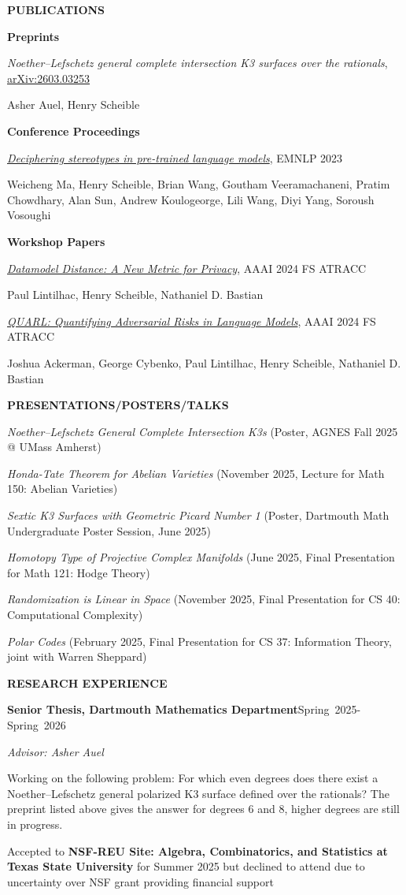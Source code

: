 \documentclass[letterpaper,11pt]{article}
\newcommand{\entrygap}{\par\addvspace{\baselineskip}}
\newcommand{\cvsection}[1]{\entrygap\textbf{\MakeUppercase{#1}}\par\nobreak\entrygap}
\newcommand{\cvsubhead}[1]{\textbf{#1}\par\nobreak}
\newcommand{\datedline}[2]{#1\hfill\mbox{#2}\par\nobreak}
\newcommand{\researchrole}[2]{\datedline{\textbf{#1}}{#2}}
\newcommand{\arxiv}[1]{\href{https://arxiv.org/abs/#1}{arXiv:#1}}
\newcommand{\doititle}[2]{\href{https://doi.org/#1}{#2}}
\newcommand{\publication}[3]{\textit{#1}, #2\par\nobreak #3\par}
\newenvironment{talks}{%
  \begin{list}{\textbullet}{%
    \setlength{\leftmargin}{36bp}\setlength{\labelsep}{10bp}%
    \setlength{\topsep}{0pt}\setlength{\partopsep}{0pt}%
    \setlength{\parsep}{0pt}\setlength{\itemsep}{0pt}}%
}{\end{list}}
\newcommand{\talk}[2]{\item \textit{#1} (#2)}
\begin{document}
\cvsection{Publications}
\cvsubhead{Preprints}
\publication{Noether–Lefschetz general complete intersection K3 surfaces over the rationals}{\arxiv{2603.03253}}{Asher Auel, Henry Scheible}

\entrygap
\cvsubhead{Conference Proceedings}
\publication{\doititle{10.18653/v1/2023.emnlp-main.697}{Deciphering stereotypes in pre-trained language models}}{EMNLP 2023}{Weicheng Ma, Henry Scheible, Brian Wang, Goutham Veeramachaneni, Pratim Chowdhary, Alan Sun, Andrew Koulogeorge, Lili Wang, Diyi Yang, Soroush Vosoughi}

\entrygap
\cvsubhead{Workshop Papers}
\publication{\doititle{10.1609/aaaiss.v4i1.31773}{Datamodel Distance: A New Metric for Privacy}}{AAAI 2024 FS ATRACC}{Paul Lintilhac, Henry Scheible, Nathaniel D. Bastian}

\entrygap
\publication{\doititle{10.1609/aaaiss.v4i1.31777}{QUARL: Quantifying Adversarial Risks in Language Models}}{AAAI 2024 FS ATRACC}{Joshua Ackerman, George Cybenko, Paul Lintilhac, Henry Scheible, Nathaniel D. Bastian}

\cvsection{Presentations/Posters/Talks}
\begin{talks}
\talk{Noether–Lefschetz General Complete Intersection K3s}{Poster, AGNES Fall 2025 @ UMass Amherst}
\talk{Honda-Tate Theorem for Abelian Varieties}{November 2025, Lecture for Math 150: Abelian Varieties}
\talk{Sextic K3 Surfaces with Geometric Picard Number 1}{Poster, Dartmouth Math Undergraduate Poster Session, June 2025}
\talk{Homotopy Type of Projective Complex Manifolds}{June 2025, Final Presentation for Math 121: Hodge Theory}
\talk{Randomization is Linear in Space}{November 2025, Final Presentation for CS 40: Computational Complexity}
\talk{Polar Codes}{February 2025, Final Presentation for CS 37: Information Theory, joint with Warren Sheppard}
\end{talks}

\cvsection{Research Experience}
\researchrole{Senior Thesis, Dartmouth Mathematics Department}{Spring 2025-Spring 2026}
\textit{Advisor: Asher Auel}\par
Working on the following problem: For which even degrees does there exist a Noether–Lefschetz
general polarized K3 surface defined over the rationals? The preprint listed
above gives the answer for degrees 6 and 8, higher degrees are still in progress.\par

\entrygap
Accepted to \textbf{NSF-REU Site: Algebra, Combinatorics, and Statistics at Texas State University} for Summer 2025 but declined to attend due to uncertainty over NSF grant providing financial support\par
\end{document}
